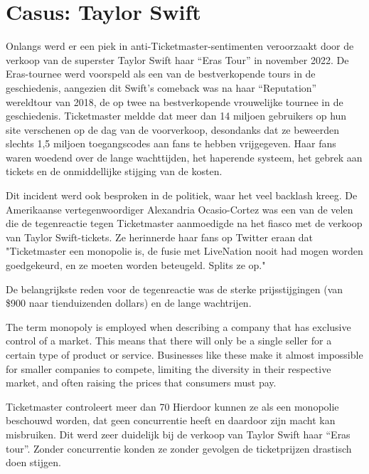 
\section{Casus: Taylor Swift}


Onlangs werd er een piek in anti-Ticketmaster-sentimenten veroorzaakt door de verkoop van de superster Taylor Swift haar “Eras Tour” in november 2022. 
De Eras-tournee werd voorspeld als een van de bestverkopende tours in de geschiedenis, aangezien dit Swift's comeback was na haar “Reputation” wereldtour van 2018, de op twee na bestverkopende vrouwelijke tournee in de geschiedenis.
Ticketmaster meldde dat meer dan 14 miljoen gebruikers op hun site verschenen op de dag van de voorverkoop, desondanks dat ze beweerden slechts 1,5 miljoen toegangscodes aan fans te hebben vrijgegeven. 
Haar fans waren woedend over de lange wachttijden, het haperende systeem, het gebrek aan tickets en de onmiddellijke stijging van de kosten.


Dit incident werd ook besproken in de politiek, waar het veel backlash kreeg.
De Amerikaanse vertegenwoordiger Alexandria Ocasio-Cortez was een van de velen die de tegenreactie tegen Ticketmaster aanmoedigde na het fiasco met de verkoop van Taylor Swift-tickets. Ze herinnerde haar fans op Twitter eraan dat "Ticketmaster een monopolie is, de fusie met LiveNation nooit had mogen worden goedgekeurd, en ze moeten worden beteugeld. Splits ze op."

De belangrijkste reden voor de tegenreactie was de sterke prijsstijgingen (van \$900 naar tienduizenden dollars) en de lange wachtrijen.


The term monopoly is employed when describing a company that has exclusive control of a market.
This means that there will only be a single seller for a certain type of product or service.
Businesses like these make it almost impossible for smaller companies to compete,
limiting the diversity in their respective market, and often raising the prices that consumers must pay.




Ticketmaster controleert meer dan 70%
Hierdoor kunnen ze als een monopolie beschouwd worden, dat geen concurrentie heeft en daardoor zijn macht kan misbruiken. Dit werd zeer duidelijk bij de verkoop van Taylor Swift haar “Eras tour”. Zonder concurrentie konden ze zonder gevolgen de ticketprijzen drastisch doen stijgen. 

